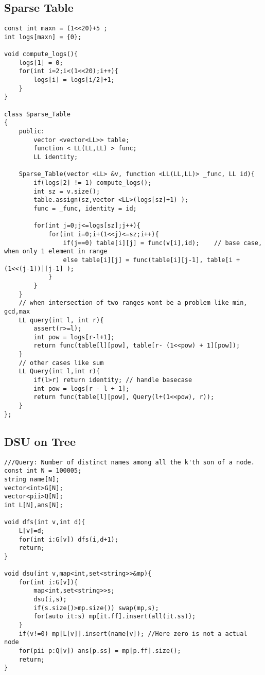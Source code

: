 \documentclass[10pt,a4paper,onesided]{article}
\begin{document}
\begin{multicols*}{3}
\subsection{Sparse Table}
\begin{lstlisting}
const int maxn = (1<<20)+5 ;
int logs[maxn] = {0};

void compute_logs(){
    logs[1] = 0;
    for(int i=2;i<(1<<20);i++){
        logs[i] = logs[i/2]+1;
    }
}

class Sparse_Table
{
    public:
        vector <vector<LL>> table; 
        function < LL(LL,LL) > func;
        LL identity;

    Sparse_Table(vector <LL> &v, function <LL(LL,LL)> _func, LL id){
        if(logs[2] != 1) compute_logs();
        int sz = v.size();
        table.assign(sz,vector <LL>(logs[sz]+1) );
        func = _func, identity = id;

        for(int j=0;j<=logs[sz];j++){
            for(int i=0;i+(1<<j)<=sz;i++){
                if(j==0) table[i][j] = func(v[i],id);    // base case, when only 1 element in range
                else table[i][j] = func(table[i][j-1], table[i + (1<<(j-1))][j-1] );
            }
        }
    }
    // when intersection of two ranges wont be a problem like min, gcd,max
    LL query(int l, int r){
        assert(r>=l);
        int pow = logs[r-l+1];
        return func(table[l][pow], table[r- (1<<pow) + 1][pow]);
    }
    // other cases like sum
    LL Query(int l,int r){
        if(l>r) return identity; // handle basecase
        int pow = logs[r - l + 1];
        return func(table[l][pow], Query(l+(1<<pow), r));
    }
};\end{lstlisting}
\subsection{DSU on Tree}
\begin{lstlisting}
///Query: Number of distinct names among all the k'th son of a node.
const int N = 100005;
string name[N];
vector<int>G[N];
vector<pii>Q[N];
int L[N],ans[N];

void dfs(int v,int d){
    L[v]=d;
    for(int i:G[v]) dfs(i,d+1);
    return;
}

void dsu(int v,map<int,set<string>>&mp){
    for(int i:G[v]){
        map<int,set<string>>s;
        dsu(i,s);
        if(s.size()>mp.size()) swap(mp,s);
        for(auto it:s) mp[it.ff].insert(all(it.ss));
    }
    if(v!=0) mp[L[v]].insert(name[v]); //Here zero is not a actual node
    for(pii p:Q[v]) ans[p.ss] = mp[p.ff].size();
    return;
}


\end{lstlisting}
\end{multicols*}
\end{document}
